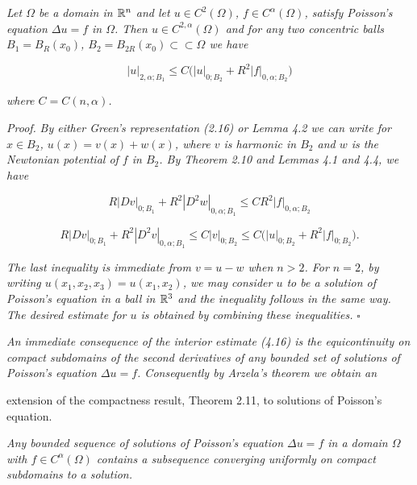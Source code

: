 \medskip

\begin{theorem}\label{gt:thm-poisson-interior-holder}
\textit{Let $\Omega$ be a domain in $\mathbb{R}^n$ and let $u\in C^2(\Omega)$, $f\in C^\alpha(\Omega)$, satisfy Poisson's equation $\Delta u=f$ in $\Omega$. Then $u\in C^{2,\alpha}(\Omega)$ and for any two concentric balls $B_1=B_R(x_0)$, $B_2=B_{2R}(x_0)\subset\subset \Omega$ we have}

\[
\tag{4.16}
\left|u\right|_{2,\alpha;B_1}\le C\bigl(\left|u\right|_{0;B_2}+R^2\left|f\right|_{0,\alpha;B_2}\bigr)
\]

\textit{where $C=C(n,\alpha)$.}

\textit{Proof.} \textit{By either Green's representation (2.16) or Lemma 4.2 we can write for $x\in B_2$, $u(x)=v(x)+w(x)$, where $v$ is harmonic in $B_2$ and $w$ is the Newtonian potential of $f$ in $B_2$. By Theorem 2.10 and Lemmas 4.1 and 4.4, we have}

\[
R\left|Dv\right|_{0;B_1}+R^2\left|D^2w\right|_{0,\alpha;B_1}\le CR^2\left|f\right|_{0,\alpha;B_2}
\]

\[
R\left|Dv\right|_{0;B_1}+R^2\left|D^2v\right|_{0,\alpha;B_1}\le C\left|v\right|_{0;B_2}\le C\bigl(\left|u\right|_{0;B_2}+R^2\left|f\right|_{0;B_2}\bigr).
\]

\textit{The last inequality is immediate from $v=u-w$ when $n>2$. For $n=2$, by writing $u(x_1,x_2,x_3)=u(x_1,x_2)$, we may consider $u$ to be a solution of Poisson's equation in a ball in $\mathbb{R}^3$ and the inequality follows in the same way. The desired estimate for $u$ is obtained by combining these inequalities.} $\square$
\end{theorem}

\medskip

\noindent\textit{An immediate consequence of the interior estimate (4.16) is the equicontinuity on compact subdomains of the second derivatives of any bounded set of solutions of Poisson's equation $\Delta u=f$. Consequently by Arzela's theorem we obtain an}



\noindent
extension of the compactness result, Theorem 2.11, to solutions of Poisson’s
equation.

\medskip

\begin{corollary}\label{gt:cor-poisson-compactness}
\emph{Any bounded sequence of solutions of Poisson’s equation $\Delta u=f$
in a domain $\Omega$ with $f\in C^{\alpha}(\Omega)$ contains a subsequence converging uniformly on
compact subdomains to a solution.}
\end{corollary}

